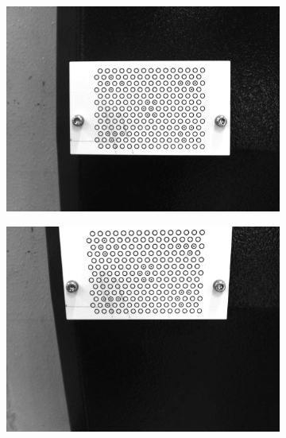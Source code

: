 \begin{figure}[h]
    \centering
    \begin{subfigure}{0.32\textwidth}
        \centering
        \includegraphics[width=\textwidth]{figures/001calibration/calibration.png}
    \end{subfigure}\hspace{0cm}
    \begin{subfigure}{0.32\textwidth}
        \centering
        \includegraphics[width=\textwidth]{figures/001calibration/calibration1.png}
    \end{subfigure}
    \vspace{0.1cm}
    \begin{subfigure}{0.32\textwidth}

\end{subfigure}
\end{figure}
